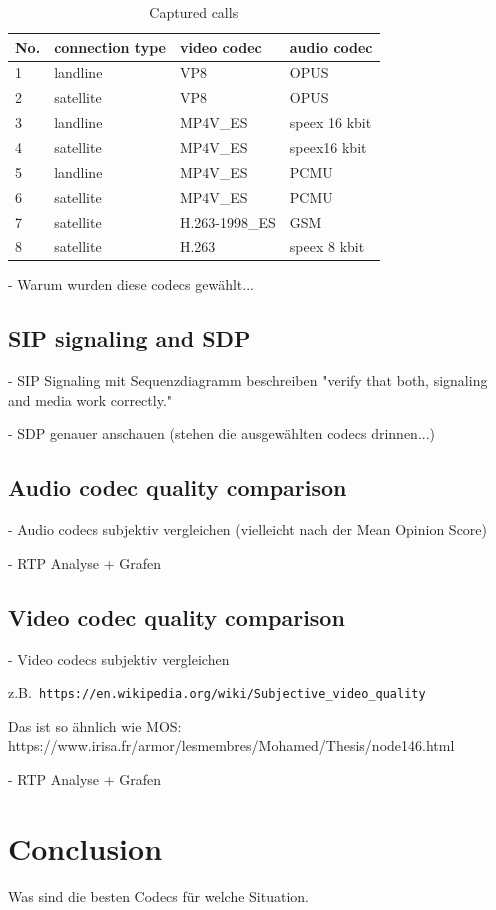 \documentclass[parskip=full]{scrartcl}
\begin{document}
\begin{table}[hb]
	\centering
	\caption{Captured calls}
	\label{tab:capture}
	\begin{tabular}{l|l|l|l}
		\toprule
		\textbf{No.} & \textbf{connection type} & \textbf{video codec} & \textbf{audio codec}  \\ \midrule
		1 & landline & VP8 & OPUS\\
		2 & satellite & VP8 & OPUS\\
		3 & landline & MP4V\_ES & speex 16 kbit\\
		4 & satellite & MP4V\_ES & speex16 kbit\\
		5 & landline & MP4V\_ES & PCMU\\
		6 & satellite & MP4V\_ES & PCMU\\
		7 & satellite & H.263-1998\_ES & GSM\\
		8 & satellite & H.263 & speex 8 kbit\\
		\bottomrule
	\end{tabular}
\end{table}

- Warum wurden diese codecs gewählt...

\subsection{SIP signaling and SDP} \label{subsec:signaling}

- SIP Signaling mit Sequenzdiagramm beschreiben "verify that both, signaling and media work correctly."

- SDP genauer anschauen (stehen die ausgewählten codecs drinnen...)

\subsection{Audio codec quality comparison} \label{subsec:audio}
- Audio codecs subjektiv  vergleichen (vielleicht nach der Mean Opinion Score)

- RTP Analyse + Grafen
\subsection{Video codec quality comparison} \label{subsec:video}
- Video codecs subjektiv vergleichen  

z.B.\verb| https://en.wikipedia.org/wiki/Subjective_video_quality | 
  
Das ist so ähnlich wie MOS:
https://www.irisa.fr/armor/lesmembres/Mohamed/Thesis/node146.html

- RTP Analyse + Grafen
\section{Conclusion}

Was sind die besten Codecs für welche Situation. 

\printbibliography
\end{document}
